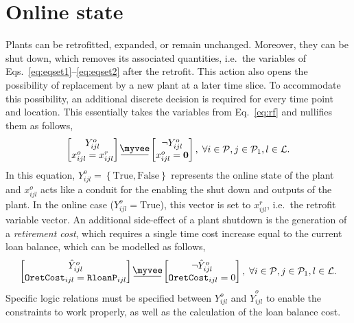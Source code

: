 \documentclass{amsbook}
\newcommand{\myveebar}{\mathbin{\vcenter{\hbox{$ \underline{\mkern-2.4mu{\myvee}\mkern-2.4mu} $}}}}
\begin{document}
\section{Online state}
%
Plants can be retrofitted, expanded, or remain unchanged. Moreover, they can be
shut down, which removes its associated quantities, i.e.\ the variables of
Eqs.~\eqref{eq:eqset1}--\eqref{eq:eqset2} after the retrofit. 
This action also opens the possibility of replacement by a new plant at a
later time slice. To accommodate this possibility, an additional discrete
decision is required for every time point and location. This essentially takes
the variables from Eq.~\eqref{eq:rf} and nullifies them as follows,
%
\begin{equation}\label{eq:online_Stat}
    \begin{bmatrix}
        Y^o_{ijl} \\
        x^o_{ijl} = x^r_{ijl}
    \end{bmatrix}
    \myveebar
    \begin{bmatrix}
        \neg Y^o_{ijl} \\
        x^o_{ijl} = \bm{0}
    \end{bmatrix}
    , \; \forall i\in \mathcal{P}, j\in \mathcal{P}_1, l\in \mathcal{L}.
\end{equation}
%
In this equation, $Y^o_{ijl} = \left\{\text{True},\text{False}\right\}$
represents the online state of the plant and $x^o_{ijl}$ acts like a conduit for
the enabling the shut down and outputs of the plant. In the online case 
($Y^o_{ijl} = \text{True}$), this vector is set to $x^r_{ijl}$, i.e.\ the
retrofit variable vector.
%
An additional side-effect
of a plant shutdown is the generation of a \emph{retirement cost}, which
requires a single time cost increase equal to the current loan balance, which
can be modelled as follows,
%
\begin{equation}\label{eq:retcost}
    \begin{bmatrix}
        \hat{Y}^o_{ijl} \\
        \mathtt{OretCost}_{ijl} = \mathtt{RloanP}_{ijl}
    \end{bmatrix}
    \myveebar
    \begin{bmatrix}
        \neg \hat{Y}^o_{ijl} \\
        \mathtt{OretCost}_{ijl} = 0
    \end{bmatrix}
    , \; \forall i\in \mathcal{P}, j\in \mathcal{P}_1, l\in \mathcal{L}.
\end{equation}
%
Specific logic relations must be specified between $Y^{o}_{ijl}$ and
$\hat{Y}^o_{ijl}$ to enable the constraints to work properly, as well as
the calculation of the loan balance cost.
%
\end{document}

